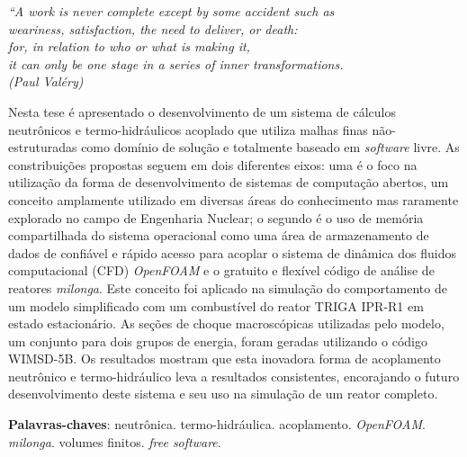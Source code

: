 \documentclass[12pt,openright,twoside,a4paper,english,french,spanish,brazil]{abntex2}
\begin{document}
\begin{epigrafe}
    \vspace*{\fill}
	\begin{flushright}
          \textit{``A work is never complete except by some accident such as\\
            weariness, satisfaction, the need to deliver, or death: \\
            for, in relation to who or what is making it, \\
            it can only be one stage in a series of inner transformations. \\
            (Paul Valéry)}
	\end{flushright}
\end{epigrafe}


\begin{resumo}

  Nesta tese é apresentado o desenvolvimento de um sistema de cálculos
  neutrônicos e termo-hidráulicos acoplado que utiliza malhas finas não-estruturadas
  como domínio de solução e totalmente baseado em \textit{software} livre.
  As constribuições propostas seguem em dois diferentes eixos: uma é o foco na utilização
  da forma de desenvolvimento de sistemas de computação abertos, um conceito amplamente
  utilizado em diversas áreas do conhecimento mas raramente explorado no campo de Engenharia Nuclear;
  o segundo é o uso de memória compartilhada do sistema operacional como uma área de armazenamento
  de dados de confiável e rápido acesso para acoplar o sistema de dinâmica dos fluidos computacional
  (CFD) \textit{OpenFOAM} e o gratuito e flexível código de análise de reatores \textit{milonga}.
  Este conceito foi aplicado na simulação do comportamento de um modelo simplificado com um combustível
  do reator TRIGA IPR-R1 em estado estacionário. As seções de choque macroscópicas utilizadas pelo
  modelo, um conjunto para dois grupos de energia, foram geradas utilizando o código WIMSD-5B.
  Os resultados mostram que esta inovadora forma de acoplamento neutrônico e termo-hidráulico leva
  a resultados consistentes,
  encorajando o futuro desenvolvimento deste sistema e seu uso na simulação de um reator completo.


 \vspace{\onelineskip}
    
 \noindent
 \textbf{Palavras-chaves}: neutrônica. termo-hidráulica. acoplamento. \textit{OpenFOAM}. \textit{milonga}. volumes finitos. \textit{free software}.
\end{resumo}
\end{document}
